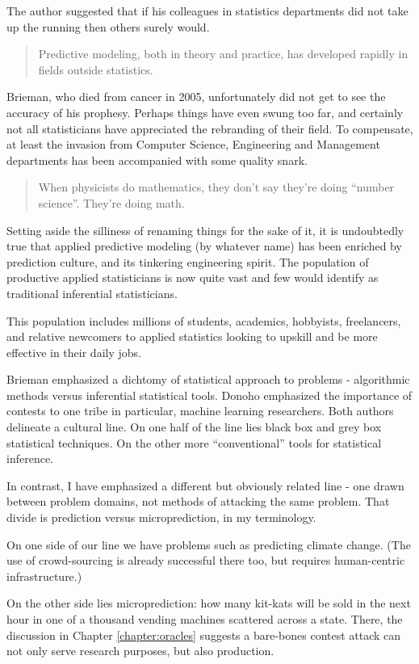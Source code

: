 The author suggested that if his colleagues in statistics departments did not take up the running then others surely would.  
\begin{quotation}
Predictive modeling, both in theory and practice, has developed rapidly in fields outside
statistics. 
\end{quotation}
Brieman, who died from cancer in 2005, unfortunately did not get to see the accuracy of his prophesy. Perhaps things have even swung too far, and certainly not all statisticians have appreciated the rebranding of their field. To compensate, at least the invasion from Computer Science, Engineering and Management departments has been accompanied with some quality snark.      
\begin{quote}{\cite{kbroman13}}
When physicists do mathematics, they don't say they're doing “number science”. They're doing math. 
\end{quote}
Setting aside the silliness of renaming things for the sake of it, it is undoubtedly true that applied predictive modeling (by whatever name) has been enriched by prediction culture, and its tinkering engineering spirit. The population of productive applied statisticians is now quite vast and few would identify as traditional inferential statisticians. 

This population includes millions of students, academics, hobbyists, freelancers, and relative newcomers to applied statistics looking to upskill and be more effective in their daily jobs. 

Brieman emphasized a dichtomy of statistical approach to problems - algorithmic methods versus inferential statistical tools. Donoho emphasized the importance of contests to one tribe in particular, machine learning researchers. Both authors delineate a cultural line. On one half of the line lies black box and grey box statistical techniques. On the other more ``conventional'' tools for statistical inference.

In contrast, I have emphasized a different but obviously related line - one drawn between problem domains, not methods of attacking the same problem. That divide is prediction versus microprediction, in my terminology. 

On one side of our line we have problems such as predicting climate change. (The use of crowd-sourcing is already successful there too, but requires human-centric infrastructure.) 

On the other side lies microprediction: how many kit-kats will be sold in the next hour in one of a thousand vending machines scattered across a state. There, the discussion in Chapter \ref{chapter:oracles} suggests a bare-bones contest attack can not only serve research purposes, but also production.     

